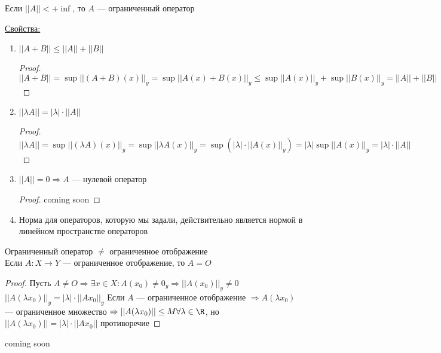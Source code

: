 \begin{Def}
Если $||A||  < +\inf$, то $A$ --- ограниченный оператор
\end{Def}
\underline{Свойства:}
\begin{enumerate}
\item $||A + B|| \le ||A|| + ||B||$
\begin{proof}
$||A + B|| = \sup ||(A + B)(x)||_y = \sup ||A(x) + B(x)||_y \le \sup ||A(x)||_y + \sup ||B(x)||_y = ||A|| + ||B||$
\end{proof}
\item $||\lambda A|| = |\lambda| \cdot ||A||$
\begin{proof}
$||\lambda A|| = \sup || (\lambda A)(x) ||_y = \sup || \lambda A(x) ||_y = \sup( |\lambda| \cdot ||A(x) ||_y) = |\lambda| \sup ||A(x)||_y = |\lambda| \cdot ||A||$
\end{proof}
\item $||A|| = 0 \Rightarrow A$ --- нулевой оператор
\begin{proof}
coming soon
\end{proof}
\item Норма для операторов, которую мы задали, действительно является нормой в линейном пространстве операторов
\end{enumerate}
\begin{Rem}
Ограниченный оператор $\neq$ ограниченное отображение\\
Если $A \colon X \rightarrow Y$ --- ограниченное отображение, то $A = O$
\end{Rem}
\begin{proof}
Пусть $A \neq O \Rightarrow \exists x \in X \colon A(x_0) \neq 0_y \Rightarrow ||A(x_0)||_y \neq 0$ \\
$||A(\lambda x_0)||_y = |\lambda| \cdot ||Ax_0||_y$
Если $A$ --- ограниченное отображение $\Rightarrow A(\lambda x_0)$ --- ограниченное множество $\Rightarrow ||A(\lambda x_0)|| \le M \forall \lambda \in \R$, но $||A(\lambda x_0)|| = |\lambda| \cdot ||Ax_0||$ противоречие
\end{proof}
coming soon